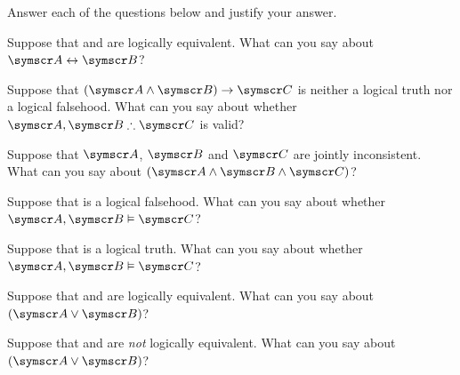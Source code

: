 \problempart
\label{pr.TT.concepts}
Answer each of the questions below and justify your answer.
\begin{earg}
\item Suppose that  and  are logically equivalent. What can you say about $\meta{A}\eiff\meta{B}$?
\item Suppose that $(\meta{A}\eand\meta{B})\eif\meta{C}$ is neither a logical truth nor a logical falsehood. What can you say about whether $\meta{A}, \meta{B} \ttherefore\meta{C}$ is valid?
\item Suppose that $\meta{A}$, $\meta{B}$ and $\meta{C}$  are jointly inconsistent. What can you say about $(\meta{A}\eand\meta{B}\eand\meta{C})$?
\item Suppose that  is a logical falsehood. What can you say about whether $\meta{A}, \meta{B} \entails \meta{C}$?
\item Suppose that  is a logical truth. What can you say about whether $\meta{A}, \meta{B}\entails \meta{C}$?
\item Suppose that  and  are logically equivalent. What can you say about $(\meta{A}\eor\meta{B})$?
\item Suppose that  and  are \emph{not} logically equivalent. What can you say about $(\meta{A}\eor\meta{B})$?
\end{earg}

